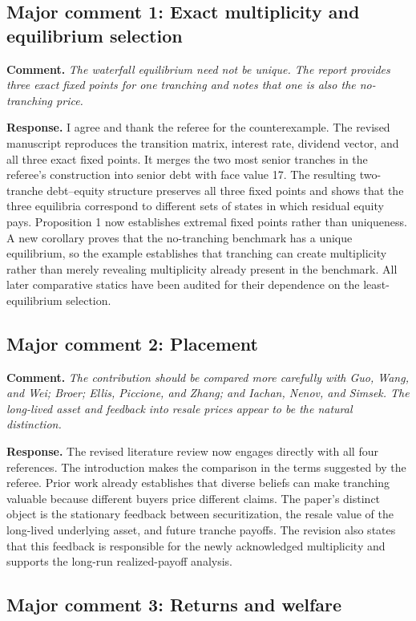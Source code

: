 \documentclass[11pt]{article}
\newcommand{\commenttext}[1]{\par\noindent\textbf{Comment.} \textit{#1}\par}
\newcommand{\response}[1]{\par\noindent\textbf{Response.} #1\par}
\begin{document}
\subsection*{Major comment 1: Exact multiplicity and equilibrium selection}

\commenttext{The waterfall equilibrium need not be unique. The report provides three exact fixed points for one tranching and notes that one is also the no-tranching price.}

\response{I agree and thank the referee for the counterexample. The revised manuscript reproduces the transition matrix, interest rate, dividend vector, and all three exact fixed points. It merges the two most senior tranches in the referee's construction into senior debt with face value 17. The resulting two-tranche debt--equity structure preserves all three fixed points and shows that the three equilibria correspond to different sets of states in which residual equity pays. Proposition 1 now establishes extremal fixed points rather than uniqueness. A new corollary proves that the no-tranching benchmark has a unique equilibrium, so the example establishes that tranching can create multiplicity rather than merely revealing multiplicity already present in the benchmark. All later comparative statics have been audited for their dependence on the least-equilibrium selection.}

\subsection*{Major comment 2: Placement}

\commenttext{The contribution should be compared more carefully with Guo, Wang, and Wei; Broer; Ellis, Piccione, and Zhang; and Iachan, Nenov, and Simsek. The long-lived asset and feedback into resale prices appear to be the natural distinction.}

\response{The revised literature review now engages directly with all four references. The introduction makes the comparison in the terms suggested by the referee. Prior work already establishes that diverse beliefs can make tranching valuable because different buyers price different claims. The paper's distinct object is the stationary feedback between securitization, the resale value of the long-lived underlying asset, and future tranche payoffs. The revision also states that this feedback is responsible for the newly acknowledged multiplicity and supports the long-run realized-payoff analysis.}

\subsection*{Major comment 3: Returns and welfare}
\end{document}
